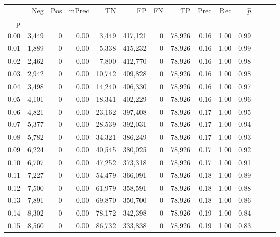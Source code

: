 \begin{tabular}{rrrrrrrrrrrrrr}
\toprule
{} &    Neg &    Pos & mPrec &       TN &       FP &      FN &      TP &  Prec &   Rec & $\hat{p}$ \\
p    &        &        &       &          &          &         &         &       &       &           \\
\midrule
0.00 &  3,449 &      0 &  0.00 &    3,449 &  417,121 &       0 &  78,926 &  0.16 &  1.00 &      0.99 \\
0.01 &  1,889 &      0 &  0.00 &    5,338 &  415,232 &       0 &  78,926 &  0.16 &  1.00 &      0.99 \\
0.02 &  2,462 &      0 &  0.00 &    7,800 &  412,770 &       0 &  78,926 &  0.16 &  1.00 &      0.98 \\
0.03 &  2,942 &      0 &  0.00 &   10,742 &  409,828 &       0 &  78,926 &  0.16 &  1.00 &      0.98 \\
0.04 &  3,498 &      0 &  0.00 &   14,240 &  406,330 &       0 &  78,926 &  0.16 &  1.00 &      0.97 \\
0.05 &  4,101 &      0 &  0.00 &   18,341 &  402,229 &       0 &  78,926 &  0.16 &  1.00 &      0.96 \\
0.06 &  4,821 &      0 &  0.00 &   23,162 &  397,408 &       0 &  78,926 &  0.17 &  1.00 &      0.95 \\
0.07 &  5,377 &      0 &  0.00 &   28,539 &  392,031 &       0 &  78,926 &  0.17 &  1.00 &      0.94 \\
0.08 &  5,782 &      0 &  0.00 &   34,321 &  386,249 &       0 &  78,926 &  0.17 &  1.00 &      0.93 \\
0.09 &  6,224 &      0 &  0.00 &   40,545 &  380,025 &       0 &  78,926 &  0.17 &  1.00 &      0.92 \\
0.10 &  6,707 &      0 &  0.00 &   47,252 &  373,318 &       0 &  78,926 &  0.17 &  1.00 &      0.91 \\
0.11 &  7,227 &      0 &  0.00 &   54,479 &  366,091 &       0 &  78,926 &  0.18 &  1.00 &      0.89 \\
0.12 &  7,500 &      0 &  0.00 &   61,979 &  358,591 &       0 &  78,926 &  0.18 &  1.00 &      0.88 \\
0.13 &  7,891 &      0 &  0.00 &   69,870 &  350,700 &       0 &  78,926 &  0.18 &  1.00 &      0.86 \\
0.14 &  8,302 &      0 &  0.00 &   78,172 &  342,398 &       0 &  78,926 &  0.19 &  1.00 &      0.84 \\
0.15 &  8,560 &      0 &  0.00 &   86,732 &  333,838 &       0 &  78,926 &  0.19 &  1.00 &      0.83 \\

\end{tabular}

